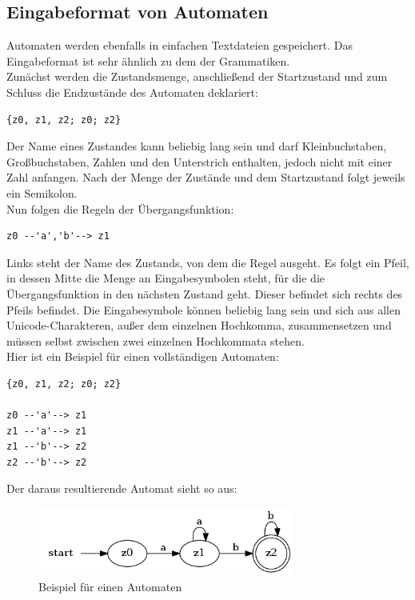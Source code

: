 \subsection{Eingabeformat von Automaten}
\label{sec:2.2}
Automaten werden ebenfalls in einfachen Textdateien gespeichert. Das Eingabeformat ist sehr ähnlich zu dem der Grammatiken.\\
Zunächst werden die Zustandsmenge, anschließend der Startzustand und zum Schluss die Endzustände des Automaten deklariert:
\begin{lstlisting}[frame=single, caption=Definition der Zustände]
{z0, z1, z2; z0; z2}
\end{lstlisting}
Der Name eines Zustandes kann beliebig lang sein und darf Kleinbuchstaben, Großbuchstaben, Zahlen und den Unterstrich enthalten, jedoch nicht mit einer Zahl anfangen. Nach der Menge der Zustände und dem Startzustand folgt jeweils ein Semikolon.\\
Nun folgen die Regeln der Übergangsfunktion:
\begin{lstlisting}[frame=single, caption=Beispiel für eine Produktion eines Automaten]
z0 --'a','b'--> z1
\end{lstlisting}
Links steht der Name des Zustands, von dem die Regel ausgeht. Es folgt ein Pfeil, in dessen Mitte die Menge an Eingabesymbolen steht, für die die Übergangsfunktion in den nächsten Zustand geht. Dieser befindet sich rechts des Pfeils befindet. Die Eingabesymbole können beliebig lang sein und sich aus allen Unicode-Charakteren, außer dem einzelnen Hochkomma, zusammensetzen und müssen selbst zwischen zwei einzelnen Hochkommata stehen.\\
Hier ist ein Beispiel für einen vollständigen Automaten:
\begin{lstlisting}[frame=single, caption=Beispiel für einen Automaten]
{z0, z1, z2; z0; z2}

z0 --'a'--> z1
z1 --'a'--> z1
z1 --'b'--> z2
z2 --'b'--> z2
\end{lstlisting}
Der daraus resultierende Automat sieht so aus:
\begin{figure}[H]
	\centering
	\includegraphics[width=0.75\textwidth]{bilder/beispiel_automat2.png}
	\caption{Beispiel für einen Automaten}
	\label{fig:pic2}
\end{figure}
\newpage
